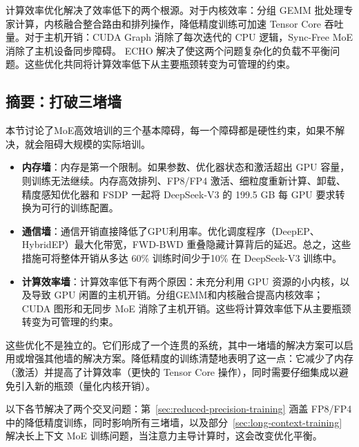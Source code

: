 \documentclass[10pt,logo,copyright]{nvidiatechreport_zh}
\begin{document}
计算效率优化解决了效率低下的两个根源。对于内核效率：分组 GEMM 批处理专家计算，内核融合整合路由和排列操作，降低精度训练可加速 Tensor Core 吞吐量。对于主机开销：CUDA Graph 消除了每次迭代的 CPU 逻辑，Sync-Free MoE 消除了主机设备同步障碍。 ECHO 解决了使这两个问题复杂化的负载不平衡问题。这些优化共同将计算效率低下从主要瓶颈转变为可管理的约束。

\subsection{摘要：打破三堵墙}

本节讨论了MoE高效培训的三个基本障碍，每一个障碍都是硬性约束，如果不解决，就会阻碍大规模的实际培训。

\begin{itemize}
    \item \textbf{内存墙}：内存是第一个限制。如果参数、优化器状态和激活超出 GPU 容量，则训练无法继续。内存高效排列、FP8/FP4 激活、细粒度重新计算、卸载、精度感知优化器和 FSDP 一起将 DeepSeek-V3 的 199.5 GB 每 GPU 要求转换为可行的训练配置。

    \item \textbf{通信墙}：通信开销直接降低了GPU利用率。优化调度程序（DeepEP、HybridEP）最大化带宽，FWD-BWD 重叠隐藏计算背后的延迟。总之，这些措施可将整体开销从多达 60\% 训练时间少于10\% 在 DeepSeek-V3 训练中。

    \item \textbf{计算效率墙}：计算效率低下有两个原因：未充分利用 GPU 资源的小内核，以及导致 GPU 闲置的主机开销。分组GEMM和内核融合提高内核效率； CUDA 图形和无同步 MoE 消除了主机开销。这些将计算效率低下从主要瓶颈转变为可管理的约束。
\end{itemize}

这些优化不是独立的。它们形成了一个连贯的系统，其中一堵墙的解决方案可以启用或增强其他墙的解决方案。降低精度的训练清楚地表明了这一点：它减少了内存（激活）并提高了计算效率（更快的 Tensor Core 操作），同时需要仔细集成以避免引入新的瓶颈（量化内核开销）。

以下各节解决了两个交叉问题：第~\ref{sec:reduced-precision-training} 涵盖 FP8/FP4 中的降低精度训练，同时影响所有三堵墙，以及部分~\ref{sec:long-context-training} 解决长上下文 MoE 训练问题，当注意力主导计算时，这会改变优化平衡。


\end{document}
